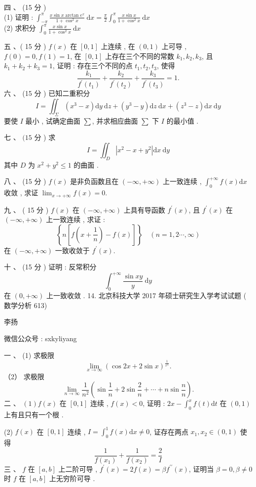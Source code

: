 \documentclass[10pt]{article}
\begin{document}
{ 四 、 (15  分 )\\
(1)  证明 : $\int_{-\pi}^{\pi} \frac{x \sin x \arctan e^{x}}{1+\cos ^{2} x} \mathrm{~d} x=\frac{\pi}{2} \int_{0}^{\pi} \frac{x \sin x}{1+\cos ^{2} x} \mathrm{~d} x$\\
(2)  求积分  $\int_{0}^{\pi} \frac{x \sin x}{1+\cos ^{2} x} \mathrm{~d} x$

 五 、( 15  分 ) $f(x)$  在  $[0,1]$  上连续 ,  在  $(0,1)$  上可导 , $f(0)=0, f(1)=1$,  在  $[0,1]$  上存在三个不同的常数  $k_{1}, k_{2}, k_{3}$,  且  $k_{1}+k_{2}+k_{3}=1$,  证明 :  存在三个不同的点  $t_{1}, t_{2}, t_{3}$,  使得 
$$
\frac{k_{1}}{f^{\prime}\left(t_{1}\right)}+\frac{k_{2}}{f^{\prime}\left(t_{2}\right)}+\frac{k_{3}}{f^{\prime}\left(t_{3}\right)}=1 .
$$
 六 、 (15  分 )  已知二重积分 
$$
I=\iint_{\Sigma}\left(x^{3}-x\right) \mathrm{d} y \mathrm{~d} z+\left(y^{3}-y\right) \mathrm{d} z \mathrm{~d} x+\left(z^{3}-z\right) \mathrm{d} x \mathrm{~d} y
$$
 要使  $I$  最小 ,  试确定曲面  $\sum$,  并求相应曲面  $\sum$  下  $I$  的最小值 .

 七 、 $(15$  分 )  求 
$$
I=\iint_{D}\left|x^{2}-x+y^{2}\right| \mathrm{d} x \mathrm{~d} y
$$
 其中  $D$  为  $x^{2}+y^{2} \leq 1$  的曲面 .

 八 、 (15  分 ) $f(x)$  是非负函数且在  $(-\infty,+\infty)$  上一致连续 , $\int_{0}^{+\infty} f(x) \mathrm{d} x$  收敛 ,  求证  $\lim _{x \rightarrow+\infty} f(x)=0$.

 九 、 ( 15  分 ) $f(x)$  在  $(-\infty,+\infty)$  上具有导函数  $f^{\prime}(x)$,  且  $f^{\prime}(x)$  在  $(-\infty,+\infty)$  上一致连续 ,  求证 :
$$
\left\{n\left[f\left(x+\frac{1}{n}\right)-f(x)\right]\right\} \quad(n=1,2 \cdots, \infty)
$$
 在  $(-\infty,+\infty)$  一致收敛于  $f^{\prime}(x)$.

 十 、 (15  分 )  证明 :  反常积分 
$$
\int_{0}^{+\infty} \frac{\sin x y}{y} \mathrm{~d} y
$$
 在  $(0,+\infty)$  上一致收敛 . 14.  北京科技大学  2017  年硕士研究生入学考试试题 ( 数学分析 613)

 李扬 

 微信公众号 : sxkyliyang

 一 、 (1)  求极限 
$$
\lim _{x \rightarrow \infty}(\cos 2 x+2 \sin x)^{\frac{1}{x^{4}}} .
$$
（2） 求极限 
$$
\lim _{n \rightarrow \infty} \frac{1}{n^{2}}\left(\sin \frac{1}{n}+2 \sin \frac{2}{n}+\cdots+n \sin \frac{n}{n}\right) .
$$
 二 、 $(1) f(x)$  在  $[0,1]$  连续 , $f(x)<0$,  证明 : $2 x-\int_{0}^{x} f(t) \mathrm{d} t$  在  $(0,1)$  上有且只有一个根 .

(2) $f(x)$  在  $[0,1]$  连续 , $I=\int_{0}^{1} f(x) \mathrm{d} x \neq 0$,  证存在两点  $x_{1}, x_{2} \in(0,1)$  使得 
$$
\frac{1}{f\left(x_{1}\right)}+\frac{1}{f\left(x_{2}\right)}=\frac{2}{I}
$$
 三 、 $f$  在  $[a, b]$  上二阶可导 , $f^{\prime}(x)=2 f(x)=\beta f^{\prime \prime}(x)$,  证明当  $\beta=0, \beta \neq 0$  时  $f$  在  $[a, b]$  上无穷阶可导 .

}
\end{document}
